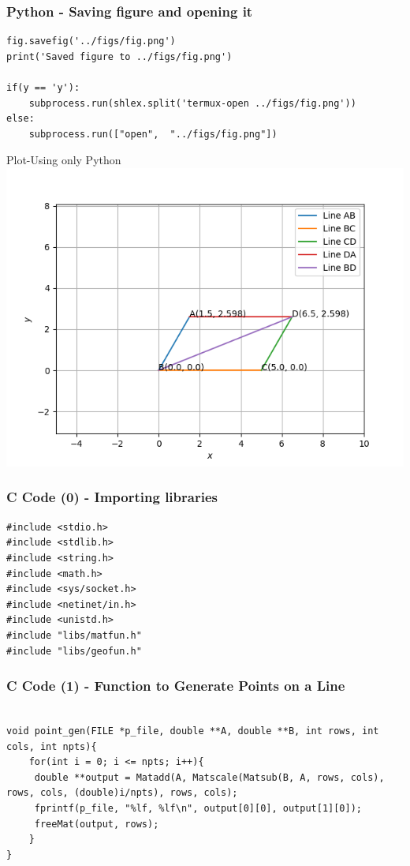 \documentclass{beamer}
\begin{document}
\begin{frame}[fragile]
    \frametitle{Python - Saving figure and opening it}
    \begin{lstlisting}
fig.savefig('../figs/fig.png')
print('Saved figure to ../figs/fig.png')

if(y == 'y'):
    subprocess.run(shlex.split('termux-open ../figs/fig.png'))
else:
    subprocess.run(["open",  "../figs/fig.png"])
    \end{lstlisting}
\end{frame}


\begin{frame}{Plot-Using only Python}
    \centering
    \includegraphics[width=\columnwidth, height=0.8\textheight, keepaspectratio]{../figs/fig.png}     
\end{frame}

\begin{frame}[fragile]
    \frametitle{C Code (0) - Importing libraries}

    \begin{lstlisting}
#include <stdio.h>
#include <stdlib.h>
#include <string.h>
#include <math.h>
#include <sys/socket.h>
#include <netinet/in.h>
#include <unistd.h>
#include "libs/matfun.h"
#include "libs/geofun.h"
    \end{lstlisting}
\end{frame}
\begin{frame}[fragile]
    \frametitle{C Code (1) - Function to Generate Points on a Line}

    \begin{lstlisting}

void point_gen(FILE *p_file, double **A, double **B, int rows, int cols, int npts){
    for(int i = 0; i <= npts; i++){
     double **output = Matadd(A, Matscale(Matsub(B, A, rows, cols), rows, cols, (double)i/npts), rows, cols);
     fprintf(p_file, "%lf, %lf\n", output[0][0], output[1][0]);
     freeMat(output, rows);
    }
}

    \end{lstlisting}
\end{frame}
\end{document}
